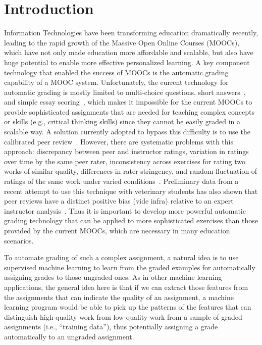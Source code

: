\section{Introduction}

Information Technologies have been transforming education dramatically
recently, leading to the rapid growth of the Massive Open Online Courses
(MOOCs), which have not only made education more affordable and scalable,
but also have huge potential to enable more effective personalized
learning.  A key component technology that enabled the success of MOOCs is
the automatic grading capability of a MOOC system. Unfortunately, the
current technology for automatic grading is mostly limited to multi-choice
questions, short answers~\cite{Brooks:2014:Powergrading,
Leacock:2003:CatH, Mitchell:2002:ICAA, Pulman:2005:EdAppsNLP,
Mohler:2009:EACL}, and simple essay scoring~\cite{Chen:2014:IRRODL,
Balfour:2013}, which makes it impossible for the current MOOCs to provide
sophisticated assignments that are needed for teaching complex concepts or
skills (e.g., critical thinking skills) since they cannot be easily graded
in a scalable way. A solution currently adopted to bypass this difficulty
is to use the calibrated peer review~\cite{Balfour:2013, Chen:2014:IRRODL,
Sandeen:2013, Suen:2014}.  However, there are systematic problems with this
approach: discrepancy between peer and instructor ratings, variation in
ratings over time by the same peer rater, inconsistency across exercises
for rating two works of similar quality, differences in rater stringency,
and random fluctuation of ratings of the same work under varied
conditions~\cite{Suen:2014}.  Preliminary data from a recent attempt to use
this technique with veterinary students has also shown that peer reviews
have a distinct positive bias (vide infra) relative to an expert instructor
analysis~\cite{Ferguson:2014}.  Thus it is important to develop more
powerful automatic grading technology that can be applied to more
sophisticated exercises than those provided by the current MOOCs, which are
necessary in many education scenarios.

To automate grading of such a complex assignment, a natural idea is to use
supervised machine learning to learn from the graded examples for
automatically assigning grades to those ungraded ones. As in other machine
learning applications, the general idea here is that if we can extract
those features from the assignments that can indicate the quality of an
assignment, a machine learning program would be able to pick up the
patterns of the features that can distinguish high-quality work from
low-quality work from a sample of graded assignments (i.e., ``training
data''), thus potentially assigning a grade automatically to an ungraded
assignment.

